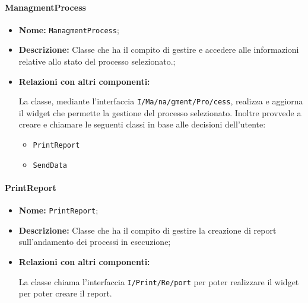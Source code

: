 \paragraph{ManagmentProcess}
\begin{flushleft}
\begin{itemize}
\item \textbf{Nome:} \texttt{ManagmentProcess};
\item \textbf{Descrizione:} Classe che ha il compito di gestire e accedere alle informazioni relative allo stato del processo selezionato.;
\item \textbf{Relazioni con altri componenti:}
\begin{sloppypar}
La classe, mediante l'interfaccia \texttt{I\fshyp{}Ma\fshyp{}na\fshyp{}gment\fshyp{}Pro\fshyp{}cess}, realizza e aggiorna il widget che permette la gestione del processo selezionato. Inoltre provvede a creare e chiamare le seguenti classi in base alle decisioni dell'utente:
\begin{itemize}
\item \texttt{PrintReport}
\item \texttt{SendData}
\end{itemize}
\end{sloppypar}
\end{itemize}
\end{flushleft}

\paragraph{PrintReport}
\begin{flushleft}
\begin{itemize}
\item \textbf{Nome:} \texttt{PrintReport};
\item \textbf{Descrizione:} Classe che ha il compito di gestire la creazione di report sull'andamento dei processi in esecuzione;
\item \textbf{Relazioni con altri componenti:}
\begin{sloppypar}
La classe chiama l'interfaccia \texttt{I\fshyp{}Print\fshyp{}Re\fshyp{}port} per poter realizzare il widget per poter creare il report.
\end{sloppypar}
\end{itemize}
\end{flushleft}

